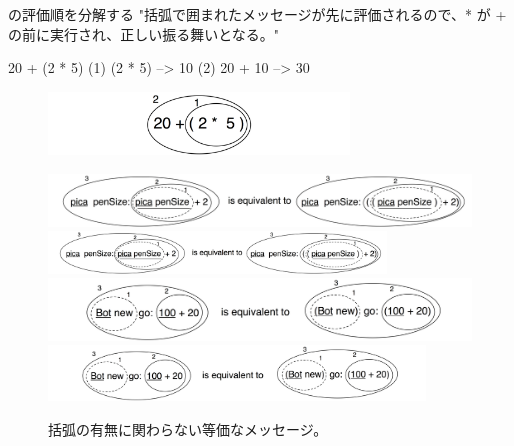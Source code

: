 \documentclass[a4paper,10pt,twoside]{book}
\begin{document}
\begin{example}[mathcorrect]{の評価順を分解する}{}
"括弧で囲まれたメッセージが先に評価されるので、* が + の前に実行され、正しい振る舞いとなる。"

    20 + (2 * 5)
(1)        (2 * 5) --> 10
(2) 20 + 10      --> 30
\end{example}

\begin{figure}
\begin{center}
\includegraphics[width=8cm]{ucompoNumberBracket}
\end{center}
\end{figure}



\begin{figure}
\begin{center}
\ifluluelse
	{\includegraphics[width=\textwidth]{uKeyUnBinPar}}
	{\includegraphics[width=0.8\textwidth]{uKeyUnBinPar}}
\ifluluelse
	{\includegraphics[width=\textwidth]{uunKeyBinPar}}
	{\includegraphics[width=10cm]{uunKeyBinPar}}
\end{center}
\caption{括弧の有無に関わらない等価なメッセージ。}
\end{figure}
\end{document}
